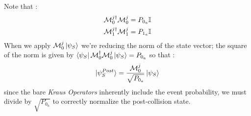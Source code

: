 \documentclass[a4paper,12pt]{article}
\begin{document}
Note that : 
\begin{gather}
	\mathcal{M}_{0}^{j \dagger}\mathcal{M}_{0}^{j}  = P_{0_{a}} \mathbb{I} \notag \\
	\mathcal{M}_{1}^{j \dagger}\mathcal{M}_{1}^{j}  = P_{1_{a}} \mathbb{I} \notag
\end{gather}
When we apply $ \mathcal{M}_{0}^{j} \ket{\psi_{S}} $ we're reducing the norm of the state vector; the square of the norm is given by $ \bra{\psi_{S}} \mathcal{M}_0^{\dagger}\mathcal{M}_{0}^{j} \ket{\psi_{S}} = P_{0_{a}} $
so that :
\begin{equation}
	\ket{\psi_{S}^{Post}} = \frac{\mathcal{M}_{0}^{j}}{\sqrt{P_{0_{a}}}} \ket{\psi_{S}}
\end{equation}
since the bare \textit{Kraus Operators} inherently include the event probability, we must divide by $ \sqrt{P_{0_{a}}} $ to correctly normalize the post-collision state.
 
\end{document}
